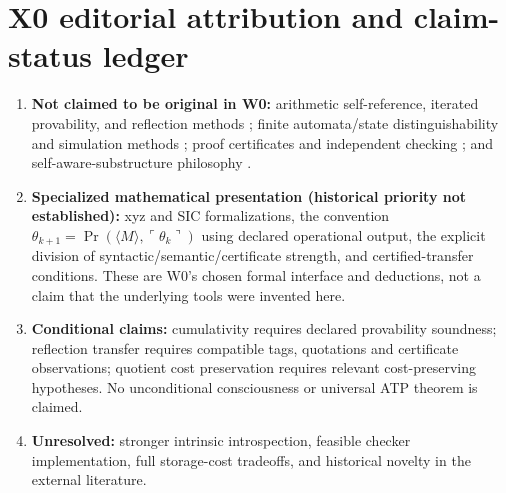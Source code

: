 \documentclass[11pt,letterpaper]{article}
\newcommand{\EditorialFooter}[1]{%
\begin{tikzpicture}[remember picture,overlay]
\node[anchor=south west,inner sep=0pt] at ([xshift=74pt,yshift=13pt]current page.south west) {\sffamily\fontsize{7}{8}\selectfont\color{black!72}\textbf{X0 retrospective citation:} #1};
\end{tikzpicture}}
\begin{document}






\clearpage
{}
\hypertarget{editorialback}{}\section*{X0 editorial attribution and claim-status ledger}
\begin{enumerate}[leftmargin=*,itemsep=.28em]
\item \textbf{Not claimed to be original in W0:} arithmetic self-reference, iterated provability, and reflection methods \cite{godel,lob,feferman}; finite automata/state distinguishability and simulation methods \cite{nerode,milner}; proof certificates and independent checking \cite{necula,besson}; and self-aware-substructure philosophy \cite{tegmark}.
\item \textbf{Specialized mathematical presentation (historical priority not established):} xyz and SIC formalizations, the convention $\theta_{k+1}=\operatorname{Pr}(\langle M\rangle,\ulcorner\theta_k\urcorner)$ using declared operational output, the explicit division of syntactic/semantic/certificate strength, and certified-transfer conditions. These are W0's chosen formal interface and deductions, not a claim that the underlying tools were invented here.
\item \textbf{Conditional claims:} cumulativity requires declared provability soundness; reflection transfer requires compatible tags, quotations and certificate observations; quotient cost preservation requires relevant cost-preserving hypotheses. No unconditional consciousness or universal ATP theorem is claimed.
\item \textbf{Unresolved:} stronger intrinsic introspection, feasible checker implementation, full storage-cost tradeoffs, and historical novelty in the external literature.
\end{enumerate}
\end{document}
